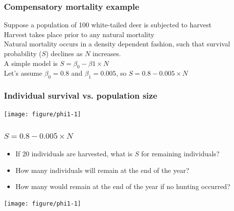 \documentclass[color=usenames,dvipsnames]{beamer}\usepackage[]{graphicx}\usepackage[]{color}
\begin{document}
\begin{frame}
  \frametitle{Compensatory mortality example}
  \large
  Suppose a population of 100 white-tailed deer is subjected to
  harvest \\
  \pause \vfill
  Harvest takes place prior to any natural mortality \\
  \pause \vfill
  Natural mortality occurs in a density dependent fashion,
  such that survival probability ($S$) declines as $N$ increases. \\
  \pause \vfill
  A simple model is $S = \beta_0 - \beta1 \times N$ \\
  \pause \vfill
  Let's assume $\beta_0 = 0.8$ and $\beta_1 = 0.005$, so
  $S = 0.8 - 0.005 \times N$
\end{frame}



\begin{frame}[fragile]
  \frametitle{Individual survival vs. population size}

\centering
\texttt{[image: figure/phi1-1]} \\
\end{frame}





\begin{frame}
  \frametitle{$S = 0.8 - 0.005 \times N$}
  \begin{itemize}[<+->]
    \small
    \item If 20 individuals are harvested, what is $S$ for
      remaining individuals?
    \item How many individuals will remain at the end of the year?
    \item How many would remain at the end of the year if no hunting
      occurred?
  \end{itemize}
  \begin{center}
    \texttt{[image: figure/phi1-1]}
  \end{center}
\end{frame}
\end{document}
